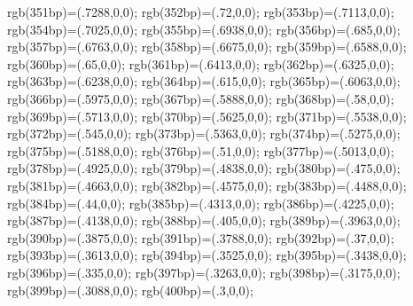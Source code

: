 {{{rgb(351bp)=(.7288,0,0); rgb(352bp)=(.72,0,0); rgb(353bp)=(.7113,0,0); rgb(354bp)=(.7025,0,0); rgb(355bp)=(.6938,0,0); rgb(356bp)=(.685,0,0); rgb(357bp)=(.6763,0,0); rgb(358bp)=(.6675,0,0); rgb(359bp)=(.6588,0,0); rgb(360bp)=(.65,0,0); rgb(361bp)=(.6413,0,0); rgb(362bp)=(.6325,0,0); rgb(363bp)=(.6238,0,0); rgb(364bp)=(.615,0,0); rgb(365bp)=(.6063,0,0); rgb(366bp)=(.5975,0,0); rgb(367bp)=(.5888,0,0); rgb(368bp)=(.58,0,0); rgb(369bp)=(.5713,0,0); rgb(370bp)=(.5625,0,0); rgb(371bp)=(.5538,0,0); rgb(372bp)=(.545,0,0); rgb(373bp)=(.5363,0,0); rgb(374bp)=(.5275,0,0); rgb(375bp)=(.5188,0,0); rgb(376bp)=(.51,0,0); rgb(377bp)=(.5013,0,0); rgb(378bp)=(.4925,0,0); rgb(379bp)=(.4838,0,0); rgb(380bp)=(.475,0,0); rgb(381bp)=(.4663,0,0); rgb(382bp)=(.4575,0,0); rgb(383bp)=(.4488,0,0); rgb(384bp)=(.44,0,0); rgb(385bp)=(.4313,0,0); rgb(386bp)=(.4225,0,0); rgb(387bp)=(.4138,0,0); rgb(388bp)=(.405,0,0); rgb(389bp)=(.3963,0,0); rgb(390bp)=(.3875,0,0); rgb(391bp)=(.3788,0,0); rgb(392bp)=(.37,0,0); rgb(393bp)=(.3613,0,0); rgb(394bp)=(.3525,0,0); rgb(395bp)=(.3438,0,0); rgb(396bp)=(.335,0,0); rgb(397bp)=(.3263,0,0); rgb(398bp)=(.3175,0,0); rgb(399bp)=(.3088,0,0); rgb(400bp)=(.3,0,0); %
}}%
\fi\fi%
}%
\makeatother%
\endinput
